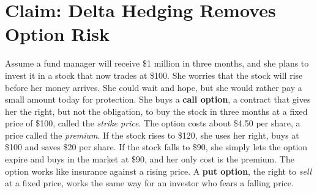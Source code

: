 \makeatletter
{}
\makeatother

\makeatletter
\makeatother

\chapter{Claim: Delta Hedging Removes Option Risk}
\label{ch:18}
\providecommand{\term}[1]{\emph{#1}}

Assume a fund manager will receive \$1 million in three months, and she plans to invest it in a stock that now trades at \$100. She worries that the stock will rise before her money arrives. She could wait and hope, but she would rather pay a small amount today for protection. She buys a \textbf{call option}, a contract that gives her the right, but not the obligation, to buy the stock in three months at a fixed price of \$100, called the \term{strike price}. The option costs about \$4.50 per share, a price called the \term{premium}. If the stock rises to \$120, she uses her right, buys at \$100 and saves \$20 per share. If the stock falls to \$90, she simply lets the option expire and buys in the market at \$90, and her only cost is the premium. The option works like insurance against a rising price. A \textbf{put option}, the right to \emph{sell} at a fixed price, works the same way for an investor who fears a falling price.

